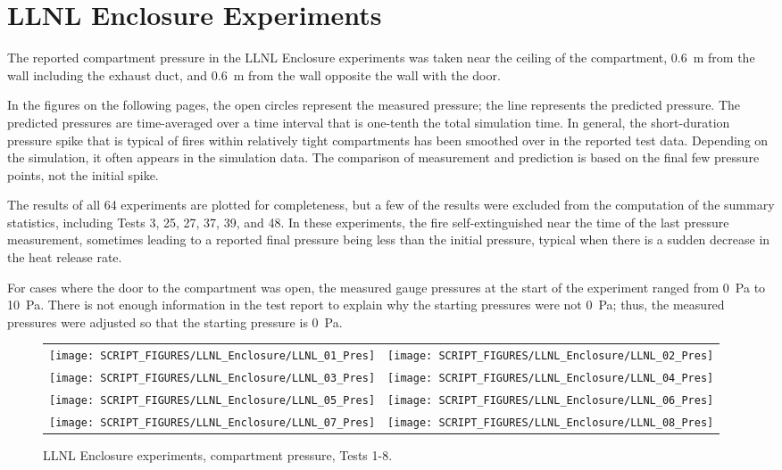 \clearpage

\section{LLNL Enclosure Experiments}

The reported compartment pressure in the LLNL Enclosure experiments was taken near the ceiling of the compartment, 0.6~m from the wall including the exhaust duct, and 0.6~m from the wall opposite the wall with the door.

In the figures on the following pages, the open circles represent the measured pressure; the line represents the predicted pressure. The predicted pressures are time-averaged over a time interval that is one-tenth the total simulation time. In general, the short-duration pressure spike that is typical of fires within relatively tight compartments has been smoothed over in the reported test data. Depending on the simulation, it often appears in the simulation data. The comparison of measurement and prediction is based on the final few pressure points, not the initial spike.

The results of all 64 experiments are plotted for completeness, but a few of the results were excluded from the computation of the summary statistics, including Tests 3, 25, 27, 37, 39, and 48. In these experiments, the fire self-extinguished near the time of the last pressure measurement, sometimes leading to a reported final pressure being less than the initial pressure, typical when there is a sudden decrease in the heat release rate.

For cases where the door to the compartment was open, the measured gauge pressures at the start of the experiment ranged from 0~Pa to 10~Pa. There is not enough information in the test report to explain why the starting pressures were not 0~Pa; thus, the measured pressures were adjusted so that the starting pressure is 0~Pa.

\begin{figure}[p]
\begin{tabular*}{\textwidth}{l@{\extracolsep{\fill}}r}
\texttt{[image: SCRIPT\_FIGURES/LLNL\_Enclosure/LLNL\_01\_Pres]} &
\texttt{[image: SCRIPT\_FIGURES/LLNL\_Enclosure/LLNL\_02\_Pres]} \\
\texttt{[image: SCRIPT\_FIGURES/LLNL\_Enclosure/LLNL\_03\_Pres]} &
\texttt{[image: SCRIPT\_FIGURES/LLNL\_Enclosure/LLNL\_04\_Pres]} \\
\texttt{[image: SCRIPT\_FIGURES/LLNL\_Enclosure/LLNL\_05\_Pres]} &
\texttt{[image: SCRIPT\_FIGURES/LLNL\_Enclosure/LLNL\_06\_Pres]} \\
\texttt{[image: SCRIPT\_FIGURES/LLNL\_Enclosure/LLNL\_07\_Pres]} &
\texttt{[image: SCRIPT\_FIGURES/LLNL\_Enclosure/LLNL\_08\_Pres]}
\end{tabular*}
\caption{LLNL Enclosure experiments, compartment pressure, Tests 1-8.}
\label{LLNL_Enclosure_Pres_1}
\end{figure}

